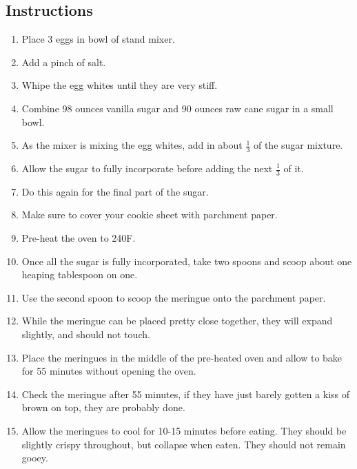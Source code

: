 \begin{multicols}{2}
\subsection*{Instructions}
\begin{enumerate}
    \item Place 3 eggs in bowl of stand mixer.
    \item Add a pinch of salt.
    \item Whipe the egg whites until they are very stiff.
    \item Combine 98 ounces vanilla sugar and 90 ounces raw cane sugar in a small bowl.
    \item As the mixer is mixing the egg whites, add in about \( \frac{1}{3} \) of the sugar mixture.
    \item Allow the sugar to fully incorporate before adding the next \( \frac{1}{3} \) of it.
    \item Do this again for the final part of the sugar.
    \item Make sure to cover your cookie sheet with parchment paper.
    \item Pre-heat the oven to 240F.
    \item Once all the sugar is fully incorporated, take two spoons and scoop about one heaping tablespoon on one.
    \item Use the second spoon to scoop the meringue onto the parchment paper.
    \item While the meringue can be placed pretty close together, they will expand slightly, and should not touch.
    \item Place the meringues in the middle of the pre-heated oven and allow to bake for 55 minutes without opening the oven.
    \item Check the meringue after 55 minutes, if they have just barely gotten a kiss of brown on top, they are probably done.
    \item Allow the meringues to cool for 10-15 minutes before eating. They should be slightly crispy throughout, but collapse when eaten. They should not remain gooey.
\end{enumerate}


\end{multicols}
